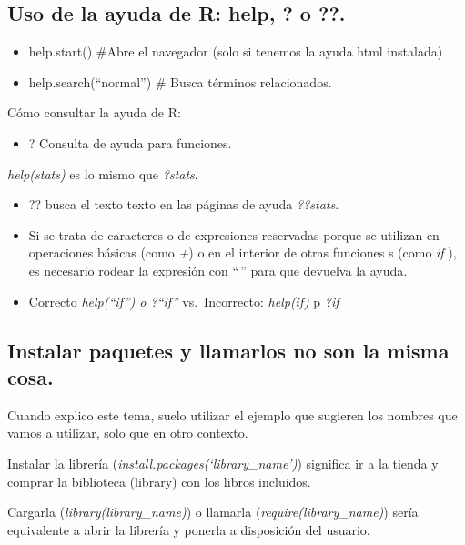 \documentclass[
  letterpaper,
  DIV=11,
  numbers=noendperiod]{scrreprt}
\providecommand{\tightlist}{%
  \setlength{\itemsep}{0pt}\setlength{\parskip}{0pt}}\usepackage{longtable,booktabs,array}
\begin{document}
\hypertarget{uso-de-la-ayuda-de-r-help-o-.}{%
\subsection{Uso de la ayuda de R: help, ? o
??.}\label{uso-de-la-ayuda-de-r-help-o-.}}

\begin{itemize}
\tightlist
\item
  help.start() \#Abre el navegador (solo si tenemos la ayuda html
  instalada)
\item
  help.search(``normal'') \# Busca términos relacionados.
\end{itemize}

Cómo consultar la ayuda de R:

\begin{itemize}
\tightlist
\item
  ? Consulta de ayuda para funciones.
\end{itemize}

\emph{help(stats)} es lo mismo que \emph{?stats}.

\begin{itemize}
\item
  ?? busca el texto texto en las páginas de ayuda \emph{??stats}.
\item
  Si se trata de caracteres o de expresiones reservadas porque se
  utilizan en operaciones básicas (como \emph{+}) o en el interior de
  otras funciones s (como \emph{if} ), es necesario rodear la expresión
  con ``\,'' para que devuelva la ayuda.
\item
  Correcto \emph{help(``if'') o ?``if''} vs.~Incorrecto: \emph{help(if)}
  p \emph{?if}
\end{itemize}

\hypertarget{instalar-paquetes-y-llamarlos-no-son-la-misma-cosa.}{%
\subsection{Instalar paquetes y llamarlos no son la misma
cosa.}\label{instalar-paquetes-y-llamarlos-no-son-la-misma-cosa.}}

Cuando explico este tema, suelo utilizar el ejemplo que sugieren los
nombres que vamos a utilizar, solo que en otro contexto.

Instalar la librería (\emph{install.packages(`library\_name')})
significa ir a la tienda y comprar la biblioteca (library) con los
libros incluidos.

Cargarla (\emph{library(library\_name)}) o llamarla
(\emph{require(library\_name)}) sería equivalente a abrir la librería y
ponerla a disposición del usuario.
\end{document}

